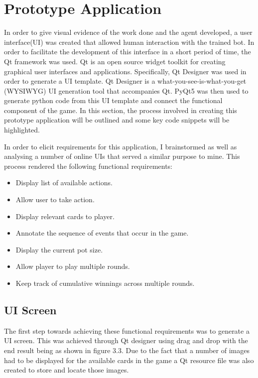 \section{Prototype Application}\label{sec:prototypeApp}
In order to give visual evidence of the work done and the agent developed, a user interface(UI) was created
that allowed human interaction with the trained bot.
In order to facilitate the development of this interface in a short period of time, the Qt framework was used.
Qt is an open source widget toolkit for creating graphical user interfaces and applications.
Specifically, Qt Designer was used in order to generate a UI template.
Qt Designer is a what-you-see-is-what-you-get (WYSIWYG) UI generation tool that accompanies Qt.
PyQt5 was then used to generate python code from this UI template and connect the functional component of the game.
In this section, the process involved in creating this prototype application will be outlined
and some key code snippets will be highlighted.

In order to elicit requirements for this application, I brainstormed as well as analysing a number
of online UIs that served a similar purpose to mine.
This process rendered the following functional requirements:

\begin{itemize}
    \item Display list of available actions.
    \item Allow user to take action.
    \item Display relevant cards to player.
    \item Annotate the sequence of events that occur in the game.
    \item Display the current pot size.
    \item Allow player to play multiple rounds.
    \item Keep track of cumulative winnings across multiple rounds.
\end{itemize}

\subsection{UI Screen}\label{subsec:UiScreen}
The first step towards achieving these functional requirements was to generate a UI screen.
This was achieved through Qt designer using drag and drop with the end result being as shown in figure 3.3.
Due to the fact that a number of images had to be displayed for the available cards in the
game a Qt resource file was also created to store and locate those images.

